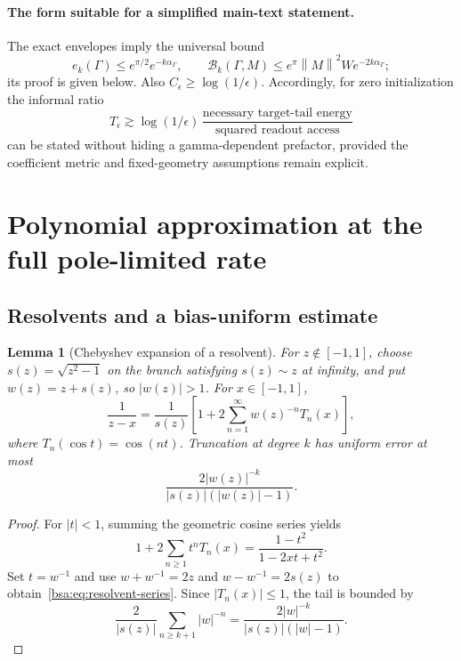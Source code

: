\documentclass[11pt,letterpaper]{article}
\newcommand{\bsaNorm}[1]{\left\lVert #1\right\rVert}
\newtheorem{bsaLemma}{Lemma}[section]
\theoremstyle{remark}
\theoremstyle{plain}
\begin{document}
\paragraph{The form suitable for a simplified main-text statement.}
The exact envelopes imply the universal bound
\begin{equation}
 e_k(\Gamma)\le e^{\pi/2}e^{-k\alpha_\Gamma},\qquad
 \mathcal B_k(\Gamma,M)\le e^\pi\bsaNorm M^2W e^{-2k\alpha_\Gamma};
 \label{bsa:eq:universal-envelope}
\end{equation}
its proof is given below. Also $C_\epsilon\ge\log(1/\epsilon)$. Accordingly, for zero initialization the informal ratio
\[
 T_\epsilon\gtrsim\log(1/\epsilon)\,
 \frac{\text{necessary target-tail energy}}{\text{squared readout access}}
\]
can be stated without hiding a gamma-dependent prefactor, provided the coefficient metric and fixed-geometry assumptions remain explicit.

\section{Polynomial approximation at the full pole-limited rate}
\label{bsa:sec:approximation}

\subsection{Resolvents and a bias-uniform estimate}

\begin{bsaLemma}[Chebyshev expansion of a resolvent]
\label{bsa:lem:resolvent}
For $z\notin[-1,1]$, choose $s(z)=\sqrt{z^2-1}$ on the branch satisfying $s(z)\sim z$ at infinity, and put $w(z)=z+s(z)$, so $|w(z)|>1$. For $x\in[-1,1]$,
\begin{equation}
 \frac1{z-x}
 =\frac1{s(z)}\left[1+2\sum_{n=1}^\infty w(z)^{-n}T_n(x)\right],
 \label{bsa:eq:resolvent-series}
\end{equation}
where $T_n(\cos t)=\cos(nt)$. Truncation at degree $k$ has uniform error at most
\begin{equation}
 \frac{2|w(z)|^{-k}}{|s(z)|(|w(z)|-1)}.
 \label{bsa:eq:resolvent-error}
\end{equation}
\end{bsaLemma}
\begin{proof}
For $|t|<1$, summing the geometric cosine series yields
\[
 1+2\sum_{n\ge1}t^nT_n(x)=\frac{1-t^2}{1-2xt+t^2}.
\]
Set $t=w^{-1}$ and use $w+w^{-1}=2z$ and $w-w^{-1}=2s(z)$ to obtain~\eqref{bsa:eq:resolvent-series}. Since $|T_n(x)|\le1$, the tail is bounded by
\[
 \frac2{|s(z)|}\sum_{n\ge k+1}|w|^{-n}
 =\frac{2|w|^{-k}}{|s(z)|(|w|-1)}.
\]
\end{proof}
\end{document}
